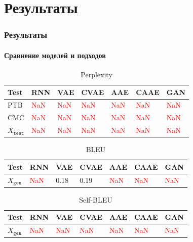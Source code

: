 \documentclass[10pt]{beamer}
\newcommand\NaN{\textcolor{red}{NaN}}
\begin{document}
\section{Результаты}
\begin{frame}
\frametitle{Результаты}
\framesubtitle{Сравнение моделей и подходов}

\begin{table}
\begin{tabular}{l | l l l l l l}
\toprule
\textbf{Test} & \textbf{RNN} & \textbf{VAE} & \textbf{CVAE} & \textbf{AAE} & \textbf{CAAE} & \textbf{GAN} \\
\midrule
PTB & \NaN & \NaN & \NaN & \NaN & \NaN & \NaN \\
CMC & \NaN & \NaN & \NaN & \NaN & \NaN & \NaN \\
\midrule
$X_{\texttt{test}}$ & \NaN & \NaN & \NaN & \NaN & \NaN & \NaN \\
\bottomrule
\end{tabular}
\caption{Perplexity}
\end{table}

\vskip-3mm

\begin{table}
\begin{tabular}{l | l l l l l l}
\toprule
\textbf{Test} & \textbf{RNN} & \textbf{VAE} & \textbf{CVAE} & \textbf{AAE} & \textbf{CAAE} & \textbf{GAN} \\
\midrule
$X_{\texttt{gen}}$ & \NaN & 0.18 & 0.19 & \NaN & \NaN & \NaN \\
\bottomrule
\end{tabular}
\caption{BLEU}
\end{table}

\vskip-3mm

\begin{table}
\begin{tabular}{l | l l l l l l}
\toprule
\textbf{Test} & \textbf{RNN} & \textbf{VAE} & \textbf{CVAE} & \textbf{AAE} & \textbf{CAAE} & \textbf{GAN} \\
\midrule
$X_{\texttt{gen}}$ & \NaN & \NaN & \NaN & \NaN & \NaN & \NaN \\
\bottomrule
\end{tabular}
\caption{Self-BLEU}
\end{table}

\end{frame}
\end{document}
